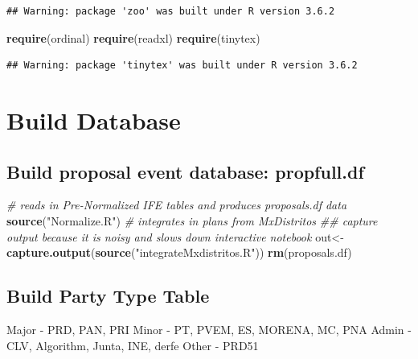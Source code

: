 \documentclass[]{article}
\newenvironment{Shaded}{\begin{snugshade}}{\end{snugshade}}
\newcommand{\CommentTok}[1]{\textcolor[rgb]{0.56,0.35,0.01}{\textit{#1}}}
\newcommand{\KeywordTok}[1]{\textcolor[rgb]{0.13,0.29,0.53}{\textbf{#1}}}
\newcommand{\NormalTok}[1]{#1}
\newcommand{\StringTok}[1]{\textcolor[rgb]{0.31,0.60,0.02}{#1}}
\begin{document}
\begin{verbatim}
## Warning: package 'zoo' was built under R version 3.6.2
\end{verbatim}

\begin{Shaded}
\begin{Highlighting}[]
\KeywordTok{require}\NormalTok{(ordinal)}
\KeywordTok{require}\NormalTok{(readxl)}
\KeywordTok{require}\NormalTok{(tinytex)}
\end{Highlighting}
\end{Shaded}

\begin{verbatim}
## Warning: package 'tinytex' was built under R version 3.6.2
\end{verbatim}

\hypertarget{build-database}{%
\section{Build Database}\label{build-database}}

\hypertarget{build-proposal-event-database-propfull.df}{%
\subsection{Build proposal event database:
propfull.df}\label{build-proposal-event-database-propfull.df}}

\begin{Shaded}
\begin{Highlighting}[]
\CommentTok{# reads in Pre-Normalized IFE tables and produces proposals.df data}
\KeywordTok{source}\NormalTok{(}\StringTok{"Normalize.R"}\NormalTok{)}
\CommentTok{# integrates in plans from MxDistritos}
\CommentTok{## capture output because it is noisy and slows down interactive notebook}
\NormalTok{out<-}\KeywordTok{capture.output}\NormalTok{(}\KeywordTok{source}\NormalTok{(}\StringTok{"integrateMxdistritos.R"}\NormalTok{))}
\KeywordTok{rm}\NormalTok{(proposals.df)}
\end{Highlighting}
\end{Shaded}

\hypertarget{build-party-type-table}{%
\subsection{Build Party Type Table}\label{build-party-type-table}}

Major - PRD, PAN, PRI Minor - PT, PVEM, ES, MORENA, MC, PNA Admin - CLV,
Algorithm, Junta, INE, derfe Other - PRD51
\end{document}
